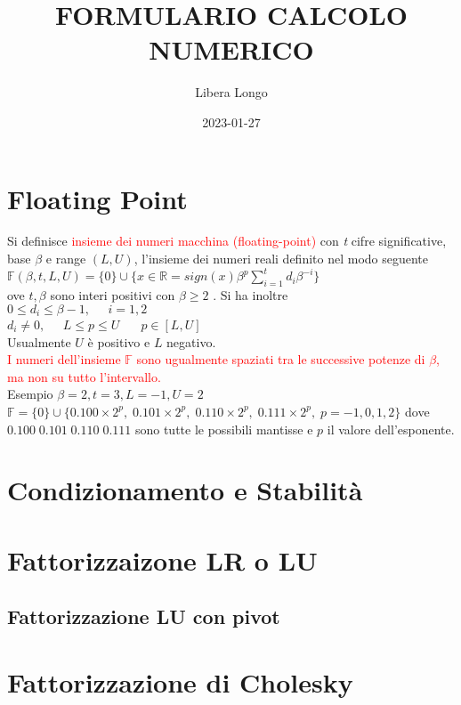 \documentclass{article}
\title{FORMULARIO CALCOLO NUMERICO}
\date{2023-01-27}
\author{Libera Longo}
\begin{document}
	\maketitle
	\printindex
	\newpage
	\section{Floating Point}

Si definisce \textcolor{red}{insieme dei numeri macchina (floating-point)} con \textit{t} cifre significative,
base $\beta$ e range $( L, U )$, l'insieme dei numeri reali definito nel modo seguente
\\
{\color{blue} $ \mathbb{F} ( \beta , t, L, U ) = \{ 0 \} \cup \{ x \in \mathbb{R} = sign(x) \beta^p \sum_{i=1}^{t} d_{i} \beta^{-i} \} $ }
\\
ove $t, \beta$ sono interi positivi con {\color{blue} $ \beta \geq 2 $ }.
Si ha inoltre
\\
{\color{blue} $ 0 \leq d_i \leq \beta -1, \;\;\;\;\; i = 1, 2 $} 
\\
{\color{blue} $ d_i \neq 0, \;\;\;\;\; L \leq p \leq U $ } $ \;\;\;\;\; p \in \left [ L, U \right ] $
\\
Usualmente $U$ è positivo e $L$ negativo.
\\
\textcolor{red}{I numeri dell'insieme $\mathbb{F}$ sono ugualmente spaziati tra le successive potenze di $\beta$, ma non su tutto l'intervallo.}
\\
Esempio
$\beta = 2, t = 3, L = -1, U = 2 $
\\
$\mathbb{F} = \{ 0 \} \cup \{ 0.100 \times 2^p, \; 0.101 \times 2^p, \; 0.110 \times 2^p, \; 0.111 \times 2^p , \; p = -1, 0, 1, 2 \} $
dove $0.100 \; 0.101 \; 0.110 \; 0.111$ sono tutte le possibili mantisse e $p$ il valore dell'esponente.

	\section{Condizionamento e Stabilità}
	\section{Fattorizzaizone LR o LU}
	\subsection{Fattorizzazione LU con pivot}
	\section{Fattorizzazione di Cholesky}
\end{document}
